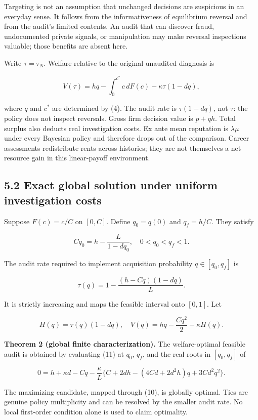 \documentclass[
  11pt,
]{article}
\begin{document}
Targeting is not an assumption that unchanged decisions are suspicious
in an everyday sense. It follows from the informativeness of equilibrium
reversal and from the audit's limited contents. An audit that can
discover fraud, undocumented private signals, or manipulation may make
reversal inspections valuable; those benefits are absent here.

Write \(\tau=\tau_N\). Welfare relative to the original unaudited
diagnosis is

\[V(\tau)=h q-\int_0^{c^*}c\,dF(c)-\kappa\tau(1-dq),\tag{8}\]

where \(q\) and \(c^*\) are determined by (4). The audit rate is
\(\tau(1-dq)\), not \(\tau\): the policy does not inspect reversals.
Gross firm decision value is \(p+qh\). Total surplus also deducts real
investigation costs. Ex ante mean reputation is \(\lambda\mu\) under
every Bayesian policy and therefore drops out of the comparison. Career
assessments redistribute rents across histories; they are not themselves
a net resource gain in this linear-payoff environment.

\subsection{5.2 Exact global solution under uniform investigation
costs}\label{exact-global-solution-under-uniform-investigation-costs}

Suppose \(F(c)=c/C\) on \([0,C]\). Define \(q_0=q(0)\) and \(q_f=h/C\).
They satisfy

\[Cq_0=h-\frac{L}{1-dq_0},\quad 0<q_0<q_f<1.\tag{9}\]

The audit rate required to implement acquisition probability
\(q\in[q_0,q_f]\) is

\[\tau(q)=1-\frac{(h-Cq)(1-dq)}{L}.\tag{10}\]

It is strictly increasing and maps the feasible interval onto \([0,1]\).
Let

\[H(q)=\tau(q)(1-dq),\quad
V(q)=h q-\frac{Cq^2}{2}-\kappa H(q).\tag{11}\]

\textbf{Theorem 2 (global finite characterization).} The welfare-optimal
feasible audit is obtained by evaluating (11) at \(q_0\), \(q_f\), and
the real roots in \([q_0,q_f]\) of

\[0=h+\kappa d-Cq-\frac{\kappa}{L}
\{C+2dh-(4Cd+2d^2h)q+3Cd^2q^2\}.\tag{12}\]

The maximizing candidate, mapped through (10), is globally optimal. Ties
are genuine policy multiplicity and can be resolved by the smaller audit
rate. No local first-order condition alone is used to claim optimality.
\end{document}
